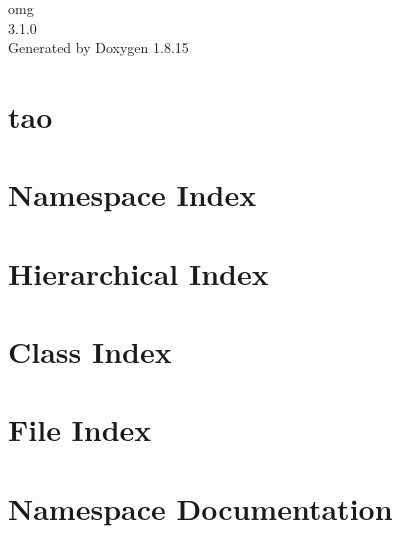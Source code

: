 \let\mypdfximage\pdfximage\def\pdfximage{\immediate\mypdfximage}\documentclass[twoside]{book}
\newcommand{\+}{\discretionary{\mbox{\scriptsize$\hookleftarrow$}}{}{}}
\newcommand{\clearemptydoublepage}{%
  \newpage{\pagestyle{empty}\cleardoublepage}%
}
\begin{document}
\hypersetup{pageanchor=false,
             bookmarksnumbered=true,
             pdfencoding=unicode
            }
\begin{titlepage}
\vspace*{7cm}
\begin{center}%
{\Large omg \\[1ex]\large 3.\+1.\+0 }\\
\vspace*{1cm}
{\large Generated by Doxygen 1.8.15}\\
\end{center}
\end{titlepage}
\clearemptydoublepage
{}
\tableofcontents
\clearemptydoublepage
{}
\hypersetup{pageanchor=true}

\chapter{tao}
\label{md__home_vitorgreati_git-repos_omg_sources_extern_tao__r_e_a_d_m_e}

\chapter{Namespace Index}

\chapter{Hierarchical Index}

\chapter{Class Index}

\chapter{File Index}

\chapter{Namespace Documentation}


\end{document}
